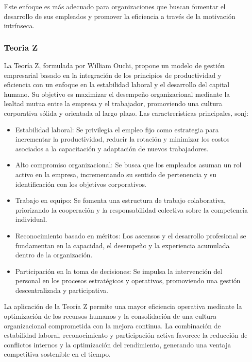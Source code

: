 \documentclass[a4paper,oneside,11pt]{article}
\begin{document}
Este enfoque es más adecuado para organizaciones que buscan fomentar el desarrollo de sus empleados y promover la eficiencia a través de la motivación intrínseca.

\subsubsection{Teoria Z}

La Teoría Z, formulada por William Ouchi, propone un modelo de gestión empresarial basado en la integración de los principios de productividad y eficiencia con un enfoque en la estabilidad laboral y el desarrollo del capital humano. Su objetivo es maximizar el desempeño organizacional mediante la lealtad mutua entre la empresa y el trabajador, promoviendo una cultura corporativa sólida y orientada al largo plazo. Las caractreristicas principales, sonj:

\begin{itemize}
    \item Estabilidad laboral: Se privilegia el empleo fijo como estrategia para incrementar la productividad, reducir la rotación y minimizar los costos asociados a la capacitación y adaptación de nuevos trabajadores.
    \item Alto compromiso organizacional: Se busca que los empleados asuman un rol activo en la empresa, incrementando su sentido de pertenencia y su identificación con los objetivos corporativos.
    \item Trabajo en equipo: Se fomenta una estructura de trabajo colaborativa, priorizando la cooperación y la responsabilidad colectiva sobre la competencia individual.
    \item Reconocimiento basado en méritos: Los ascensos y el desarrollo profesional se fundamentan en la capacidad, el desempeño y la experiencia acumulada dentro de la organización.
    \item Participación en la toma de decisiones: Se impulsa la intervención del personal en los procesos estratégicos y operativos, promoviendo una gestión descentralizada y participativa.
\end{itemize}

La aplicación de la Teoría Z permite una mayor eficiencia operativa mediante la optimización de los recursos humanos y la consolidación de una cultura organizacional comprometida con la mejora continua. La combinación de estabilidad laboral, reconocimiento y participación activa favorece la reducción de conflictos internos y la optimización del rendimiento, generando una ventaja competitiva sostenible en el tiempo.
\end{document}
